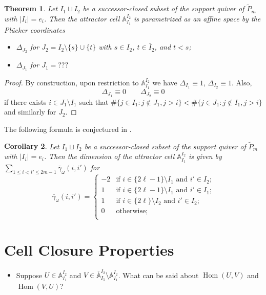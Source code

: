 \documentclass{amsart}
\newtheorem{theorem}{Theorem}
\newtheorem{corollary}[theorem]{Corollary}
\numberwithin{equation}{section}
\renewcommand{\AA}{\mathbb{A}}
\newcommand{\Hom}{\operatorname{Hom}}
\begin{document}
  \begin{theorem}
    Let $I_1\sqcup I_2$ be a successor-closed subset of the support quiver of $\tilde P_m$ with $|I_i|=e_i$.
    Then the attractor cell $\AA_{I_1}^{I_2}$ is parametrized as an affine space by the Pl\"ucker coordinates
    \begin{itemize}
      \item $\Delta_{J_2}$ for $J_2=I_2\setminus\{s\}\cup\{t\}$ with $s\in I_2$, $t\in\bar{I}_2$, and $t<s$;
      \item $\Delta_{J_1}$ for $J_1=???$
    \end{itemize}
  \end{theorem}
  \begin{proof}
    By construction, upon restriction to $\AA_{I_1}^{I_2}$ we have $\Delta_{I_1}\equiv 1$, $\Delta_{I_2}\equiv 1$.
    Also,
    \[\Delta_{J_1}\equiv 0 \qquad \Delta_{J_2}\equiv 0\]
    if there exists $i\in J_1\setminus I_1$ such that $\#\{j\in I_1:j\notin J_1, j>i\} < \#\{j\in J_1:j\notin I_1,j>i\}$ and similarly for $J_2$.
  \end{proof}

  The following formula is conjectured in \cite{rupel-weist}.
  \begin{corollary}
    Let $I_1\sqcup I_2$ be a successor-closed subset of the support quiver of $\tilde P_m$ with $|I_i|=e_i$.
    Then the dimension of the attractor cell $\AA_{I_1}^{I_2}$ is given by $\sum\limits_{1 \le i < i' \le 2m-1}\overline{\gamma}_\omega(i,i')$ for
    \begin{equation}
      \overline{\gamma}_\omega(i,i')=\begin{cases}
        -2 & \text{if $i\in \{2\ell-1\}\setminus I_1$ and $i'\in I_2$;}\\ 
        1 & \text{if $i\in \{2\ell-1\}\setminus I_1$ and $i'\in I_1$;}\\ 
        1 & \text{if $i\in \{2\ell\}\setminus I_2$ and $i'\in I_2$;}\\ 
        0 & \text{otherwise;}\\ 
      \end{cases}
    \end{equation} 
  \end{corollary}

\section{Cell Closure Properties}

  \begin{itemize}
    \item Suppose $U\in\AA_{I_1}^{I_2}$ and $V\in\overline{\AA}_{I_1}^{I_2}\setminus\AA_{I_1}^{I_2}$.
      What can be said about $\Hom(U,V)$ and $\Hom(V,U)$?
  \end{itemize}
\end{document}
